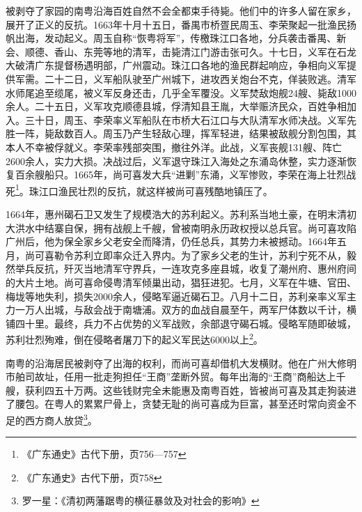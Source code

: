 被剥夺了家园的南粤沿海百姓自然不会全都束手待毙。他们中的许多人留在家乡，展开了正义的反抗。1663年十月十五日，番禺市桥疍民周玉、李荣聚起一批渔民扬帆出海，发动起义。周玉自称“恢粤将军”，传檄珠江口各地，分兵袭击番禺、新会、顺德、香山、东莞等地的清军，击毙清江门游击张可久。十七日，义军在石龙大破清广东提督杨遇明部，广州震动。珠江口各地的渔民群起响应，争相向义军提供军需。二十二日，义军船队驶至广州城下，进攻西关炮台不克，佯装败逃。清军水师尾追至缆尾，被义军反身还击，几乎全军覆没。义军焚敌炮舰24艘、毙敌1000余人。二十五日，义军攻克顺德县城，俘清知县王胤，大举赈济民众，百姓争相加入。三十日，周玉、李荣率义军船队在市桥大石江口与大队清军水师决战。义军先胜一阵，毙敌数百人。周玉乃产生轻敌心理，挥军轻进，结果被敌舰分割包围，其本人不幸被俘就义。李荣率残部突围，撤往外洋。此战，义军丧舰131艘、阵亡2600余人，实力大损。决战过后，义军退守珠江入海处之东涌岛休整，实力逐渐恢复百余艘船只。1665年，尚可喜发大兵“进剿”东涌，义军惨败，李荣在海上壮烈战死\footnote{《广东通史》古代下册，页756—757}。珠江口渔民壮烈的反抗，就这样被尚可喜残酷地镇压了。

1664年，惠州碣石卫又发生了规模浩大的苏利起义。苏利系当地土豪，在明末清初大洪水中结寨自保，拥有战舰上千艘，曾被南明永历政权授以总兵官。尚可喜攻陷广州后，他为保全家乡父老安全而降清，仍任总兵，其势力未被撼动。1664年五月，尚可喜勒令苏利立即率众迁入界内。为了家乡父老的生计，苏利宁死不从，毅然举兵反抗，歼灭当地清军守界兵，一连攻克多座县城，收复了潮州府、惠州府间的大片土地。尚可喜命侵粤清军倾巢出动，猖狂进犯。七月，义军在牛塘、官田、梅垅等地失利，损失2000余人，侵略军逼近碣石卫。八月十二日，苏利亲率义军主力一万人出城，与敌会战于南塘浦。双方的血战自晨至午，两军尸体数以千计，横铺四十里。最终，兵力不占优势的义军战败，余部退守碣石城。侵略军随即破城，苏利壮烈殉难，倒在侵略者屠刀下的起义军民达6000以上\footnote{《广东通史》古代下册，页758}。

南粤的沿海居民被剥夺了出海的权利，而尚可喜却借机大发横财。他在广州大修明市舶司故址，任用一批走狗担任“王商”垄断外贸。每年出海的“王商”商船达上千艘，获利四五十万两。这些钱财完全未能惠及南粤百姓，皆被尚可喜及其走狗装进了腰包。在粤人的累累尸骨上，贪婪无耻的尚可喜成为巨富，甚至还时常向资金不足的西方商人放贷\footnote{罗一星：《清初两藩踞粤的横征暴敛及对社会的影响》}。

